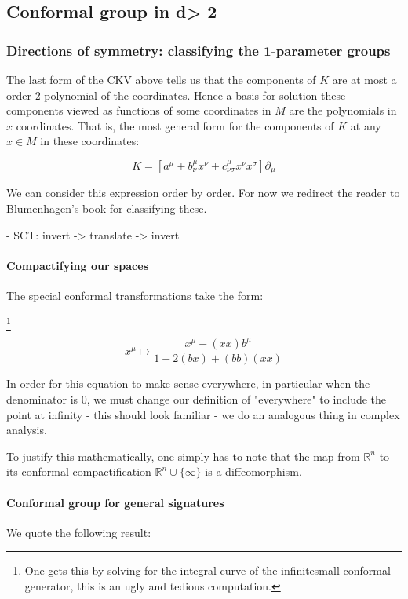 \subsection{ Conformal group in d> 2}
\subsubsection{ Directions of symmetry: classifying the 1-parameter groups}

The last form of the CKV above tells us that the components of $K$ are at most a order 2 polynomial of the coordinates. Hence a basis for solution these components viewed as functions of some coordinates in $M$ are the polynomials in $x$ coordinates. That is, the most general form for the components of $K$ at any $x \in M$ in these coordinates:

$$K = [a^\mu + b^\mu_\nu x^\nu + c^\mu_{\nu\sigma}x^\nu x^\sigma] \partial_\mu$$

We can consider this expression order by order. For now we redirect the reader to Blumenhagen's book for classifying these.


- SCT: invert -> translate -> invert


\paragraph{ Compactifying our spaces}
The special conformal transformations take the form:

\footnote{ One gets this by solving for the integral curve of the infinitesmall conformal generator, this is an ugly and tedious computation.}

$$x^\mu \mapsto \frac{x^\mu - (x \dot{} x) b^\mu}{1 - 2(b \dot{} x) + (b \dot{} b)(x\dot{} x)}$$

In order for this equation to make sense everywhere, in particular when the denominator is $0$, we must change our definition of "everywhere" to include the point at infinity - this should look familiar - we do an analogous thing in complex analysis. 

To justify this mathematically, one simply has to note that the map from $\mathbb{R}^n$ to its conformal compactification $\mathbb{R}^n \cup \{ \infty \}$ is a diffeomorphism.

\paragraph{ Conformal group for general signatures}
We quote the following result:

